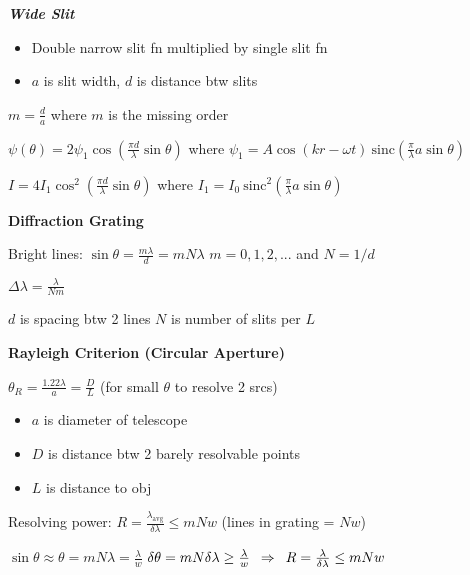 \documentclass[twocolumn]{article}
\begin{document}
\textbf{\textit{Wide Slit}} \vspace{-.5em}
\begin{itemize}
    \item Double narrow slit fn multiplied by single slit fn
    \item $a$ is slit width, $d$ is distance btw slits
\end{itemize}

$m = \frac{d}{a}$ \hfill where $m$ is the missing order

$\psi(\theta) = 2 \psi_1 \cos \left( \frac{\pi d}{\lambda} \sin \theta \right)$ \hfill where $\psi_1 = A \cos(kr - \omega t)\ \text{sinc} \left( \frac{\pi}{\lambda} a \sin \theta \right)$

$I = 4 I_1 \cos^2 \left( \frac{\pi d}{\lambda} \sin \theta \right)$ \hfill where $I_1 = I_0\ \text{sinc}^2 \left( \frac{\pi}{\lambda} a \sin\theta \right)$

\vspace{-.5em}

\dotfill

\textbf{Diffraction Grating}

Bright lines: $\sin \theta = \frac{m \lambda}{d} = m N \lambda$ \hfill $m = 0, 1, 2, ...$ and $N = 1/d$

$\Delta \lambda = \frac{\lambda}{Nm}$

$d$ is spacing btw 2 lines \hfill $N$ is number of slits per $L$

\vspace{-.5em}

\dotfill

\textbf{Rayleigh Criterion (Circular Aperture)}

$\theta_R = \frac{1.22 \lambda}{a} = \frac{D}{L}$ \hfill (for small $\theta$ to resolve 2 srcs) \vspace{-.5em}
\begin{itemize}
    \item $a$ is diameter of telescope
    \item $D$ is distance btw 2 barely resolvable points
    \item $L$ is distance to obj
\end{itemize}

Resolving power: $R = \frac{\lambda_{\text{avg}}}{\delta \lambda} \leq m N w$ \hfill (lines in grating = $Nw$)

$\sin \theta \approx \theta = m N \lambda = \frac{\lambda}{w}$ \hfill $\delta \theta = m N \delta \lambda \geq \frac{\lambda}{w} \hspace{.5em} \Rightarrow \hspace{.5em} R = \frac{\lambda}{\delta \lambda} \leq mNw$
\end{document}
